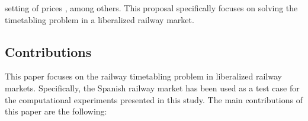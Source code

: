\documentclass[Afour,sagev,times]{sagej}
\begin{document}
setting of prices \cite{Smoliner2018}, among others. This proposal specifically focuses on solving the timetabling problem in a liberalized railway market. 


\subsection{Contributions}
\label{subsec:contributions}

This paper focuses on the railway timetabling problem in liberalized railway markets. Specifically, the Spanish railway market has been used as a test case for the computational experiments presented in this study. The main contributions of this paper are the following:
\end{document}

